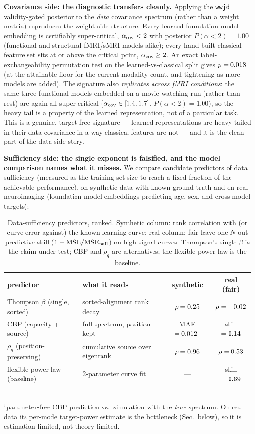 \textbf{Covariance side: the diagnostic transfers cleanly.} Applying the \texttt{wwjd} validity-gated
posterior to the \emph{data} covariance spectrum (rather than a weight matrix) reproduces the weight-side
structure. Every learned foundation-model embedding is certifiably super-critical, $\alpha_{\rm cov}<2$
with posterior $P(\alpha<2)=1.00$ (functional and structural fMRI/sMRI models alike); every hand-built
classical feature set sits at or above the critical point, $\alpha_{\rm cov}\ge 2$. An exact
label-exchangeability permutation test on the learned-vs-classical split gives $p=0.018$ (at the
attainable floor for the current modality count, and tightening as more models are added). The signature
also \emph{replicates across fMRI conditions}: the same three functional models embedded on a movie-watching
run (rather than rest) are again all super-critical ($\alpha_{\rm cov}\in[1.4,1.7]$, $P(\alpha<2)=1.00$),
so the heavy tail is a property of the learned representation, not of a particular task. This is a
genuine, target-free signature --- learned representations are heavy-tailed in their data covariance in a
way classical features are not --- and it is the clean part of the data-side story.

\textbf{Sufficiency side: the single exponent is falsified, and the model comparison names what it
misses.} We compare candidate predictors of data sufficiency (measured as the training-set size to reach
a fixed fraction of the achievable performance), on synthetic data with known ground truth and on real
neuroimaging (foundation-model embeddings predicting age, sex, and cross-model targets):

\begin{table}[t]
\centering
\caption{Data-sufficiency predictors, ranked. Synthetic column: rank correlation with (or curve error
against) the known learning curve; real column: fair leave-one-$N$-out predictive skill ($1-{\rm
MSE}/{\rm MSE}_{\rm null}$) on high-signal curves. Thompson's single $\beta$ is the claim under test; CBP
and $\rho_q$ are alternatives; the flexible power law is the baseline.}
\small
\setlength{\tabcolsep}{4pt}
\begin{tabular}{llcc}
\toprule
predictor & what it reads & synthetic & real (fair) \\
\midrule
Thompson $\beta$ (single, sorted) & sorted-alignment rank decay & $\rho=0.25$ & $\rho=-0.02$ \\
CBP (capacity + source) & full spectrum, position kept & MAE $=0.012$$^{\dagger}$ & skill $=0.14$ \\
$\rho_q$ (position-preserving) & cumulative source over eigenrank & $\rho=0.96$ & $\rho=0.53$ \\
flexible power law (baseline) & 2-parameter curve fit & --- & skill $=0.69$ \\
\bottomrule
\end{tabular}
\\[2pt]
{\footnotesize $^{\dagger}$parameter-free CBP prediction vs.\ simulation with the \emph{true} spectrum.
On real data its per-mode target-power estimate is the bottleneck (Sec.~below), so it is
estimation-limited, not theory-limited.}
\label{tab:dataside_compare}
\end{table}

